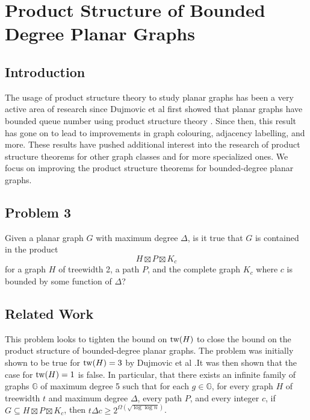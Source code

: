 \documentclass[../main.tex]{subfiles}
\begin{document}
	
	\section{Product Structure of Bounded Degree Planar Graphs}
	\subsection{Introduction}
	The usage of product structure theory to study planar graphs has been a very active area of research since Dujmovic et al first showed that planar graphs have bounded queue number using product structure theory \cite{DJMMUW20}. Since then, this result has gone on to lead to improvements in graph colouring\cite{DEJWW20}, adjacency labelling\cite{DEJGMM21,EJM23}, and more. 
	These results have pushed additional interest into the research of product structure theorems for other graph classes and for more specialized ones. We focus on improving the product structure theorems for bounded-degree planar graphs.
	
	\subsection{Problem 3}
	Given a planar graph $G$ with maximum degree $\Delta$, is it true that $G$ is contained in the product $$H\boxtimes P\boxtimes K_c$$ for a graph $H$ of treewidth 2, a path $P$, and the complete graph $K_c$ where $c$ is bounded by some function of $\Delta$?
	
	\subsection{Related Work}
	This problem looks to tighten the bound on $\operatorname{tw}(H)$ to close the bound on the product structure of bounded-degree planar graphs. The problem was initially shown to be true for $\operatorname{tw}(H)=3$ by Dujmovic et al \cite{DJMMUW20}.It was then shown that the case for $\operatorname{tw}(H)=1$ is false\cite{DJMMW24}. 
	In particular, that there exists an infinite family of graphs $\mathbb{G}$ of maximum degree 5 such that for each $g\in\mathbb{G}$, for every graph $H$ of treewidth $t$ and maximum degree $\Delta$, every path $P$, and every integer $c$, if $G\subseteq H \boxtimes P\boxtimes K_c$, then $t\Delta c\ge 2^{\Omega(\sqrt{\log\log n})}$.
	
	
	
	
\end{document}
